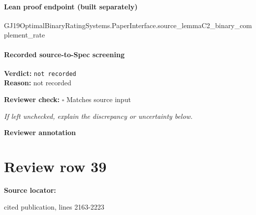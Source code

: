 \documentclass[10pt]{article}
\newcommand{\reviewerbox}{%
  \par\noindent\fbox{\parbox{0.96\linewidth}{\rule{0pt}{0.38in}}}\par
}
\newcommand{\reviewmatch}[1]{%
  \par\noindent\textbf{Reviewer check:} $\square$\; #1\par
  \noindent\emph{If left unchecked, explain the discrepancy or uncertainty below.}\par
}
\begin{document}
\paragraph{Lean proof endpoint (built separately)}\begin{ReviewVerbatim}
GJ19OptimalBinaryRatingSystems.PaperInterface.source_lemmaC2_binary_complement_rate
\end{ReviewVerbatim}

\paragraph{Recorded source-to-Spec screening}
\textbf{Verdict:} \texttt{not recorded}
\\
\textbf{Reason:} not recorded
\reviewmatch{Matches source input}
\noindent\textbf{Reviewer annotation}\par
\reviewerbox
\clearpage
\hypertarget{source-claim-d95b8ab740a8ceda}{}
\section*{Review row 39}
\textbf{Source locator:} {\footnotesize\raggedright cited publication, lines 2163-\allowbreak{}2223\par}
\end{document}
